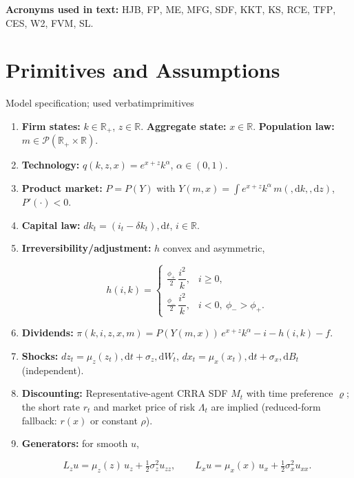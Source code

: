 ﻿\documentclass[11pt,letterpaper,oneside]{article}
\numberwithin{equation}{section}
\newcommand{\ac}[1]{{\mdseries\textsc{#1}}}
\newcommand{\printacronyms}{}
\newcommand{\R}{\mathbb{R}}
\newcommand{\1}{\mathbf{1}}
\newcommand{\diff}{,\mathrm{d}}
\newcommand{\Lz}{L_z}
\newcommand{\Lx}{L_x}
\newcommand{\YY}{Y(m,x)}
\begin{document}
\medskip
\noindent\textbf{Acronyms used in text:} \ac{HJB}, \ac{FP}, \ac{ME}, \ac{MFG}, \ac{SDF}, \ac{KKT}, \ac{KS}, \ac{RCE}, \ac{TFP}, \ac{CES}, \ac{W2}, \ac{FVM}, \ac{SL}.
\medskip

\printacronyms

\section{Primitives and Assumptions}

\begin{assumption}{Model specification; used verbatim}{primitives}
\begin{enumerate}[label=(\roman*),itemsep=0.25em]
\item \textbf{Firm states:} $k\in\R_+$, $z\in\R$. \textbf{Aggregate state:} $x\in\R$. \textbf{Population law:} $m\in\mathcal P(\R_+\times\R)$.
\item \textbf{Technology:} $q(k,z,x)=e^{x+z}k^\alpha$, $\alpha\in(0,1)$.
\item \textbf{Product market:} $P=P(Y)$ with $Y(m,x)=\int e^{x+z}k^\alpha\, m(\diff k,\diff z)$, $P'(\cdot)<0$.
\item \textbf{Capital law:} $dk_t=(i_t-\delta k_t)\diff t$, $i\in\R$.
\item \textbf{Irreversibility/adjustment:} $h$ convex and asymmetric,

$$
h(i,k)=
\begin{cases}
\tfrac{\phi_+}{2}\,\dfrac{i^2}{k}, & i\ge 0,\\[3pt]
\tfrac{\phi_-}{2}\,\dfrac{i^2}{k}, & i<0,\ \phi_->\phi_+.
\end{cases}
$$

\item \textbf{Dividends:} $\pi(k,i,z,x,m)=P(\YY)\,e^{x+z}k^\alpha - i - h(i,k) - f$.
\item \textbf{Shocks:} $dz_t=\mu_z(z_t)\diff t+\sigma_z\diff W_t$, $dx_t=\mu_x(x_t)\diff t+\sigma_x\diff B_t$ (independent).
\item \textbf{Discounting:} Representative-agent CRRA SDF $M_t$ with time preference $\varrho$; the short rate $r_t$ and market price of risk $\Lambda_t$ are implied (reduced-form fallback: $r(x)$ or constant $\rho$).
\item \textbf{Generators:} for smooth $u$,

$$
\Lz u=\mu_z(z)\,u_z+\tfrac12\sigma_z^2 u_{zz},\qquad
\Lx u=\mu_x(x)\,u_x+\tfrac12\sigma_x^2 u_{xx}.
$$

\end{enumerate}
\end{assumption}
\end{document}
